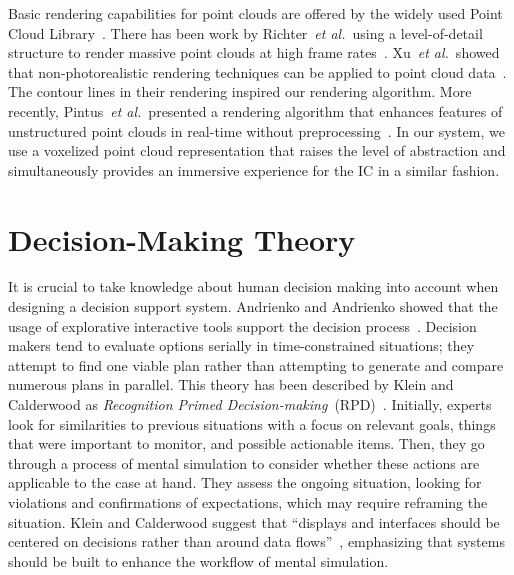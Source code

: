 \documentclass{egpubl}
\def\etal{\textit{et al.}}
\begin{document}
 Basic rendering capabilities for point clouds are offered by the widely used Point Cloud Library~\cite{Rusu11ICRA}. There has been work by Richter~\etal\ using a level-of-detail structure to render massive point clouds at high frame rates~\cite{Richter:2010:ORV:1811158.1811178}. Xu~\etal\ showed that non-photorealistic rendering techniques can be applied to point cloud data~\cite{conf/npar/XuC04}. The contour lines in their rendering inspired our rendering algorithm. More recently, Pintus~\etal\ presented a rendering algorithm that enhances features of unstructured point clouds in real-time without preprocessing~\cite{Pintus:2011:RRM:2384495.2384513}. In our system, we use a voxelized point cloud representation that raises the level of abstraction and simultaneously provides an immersive experience for the IC in a similar fashion.


\section{Decision-Making Theory} \label{sec:theory}
It is crucial to take knowledge about human decision making into account when designing a decision support system. Andrienko and Andrienko showed that the usage of explorative interactive tools support the decision process~\cite{Andrienko:2003kv}. Decision makers tend to evaluate options serially in time-constrained situations; they attempt to find one viable plan rather than attempting to generate and compare numerous plans in parallel. This theory has been described by Klein and Calderwood as \emph{Recognition Primed Decision-making}~(RPD)~\cite{KleinCalderwood}. Initially, experts look for similarities to previous situations with a focus on relevant goals, things that were important to monitor, and possible actionable items. Then, they go through a process of mental simulation to consider whether these actions are applicable to the case at hand. They assess the ongoing situation, looking for violations and confirmations of expectations, which may require reframing the situation. Klein and Calderwood suggest that ``displays and interfaces should be centered on decisions rather than around data flows''~\cite{KleinCalderwood}, emphasizing that systems should be built to enhance the workflow of mental simulation. 
\end{document}
